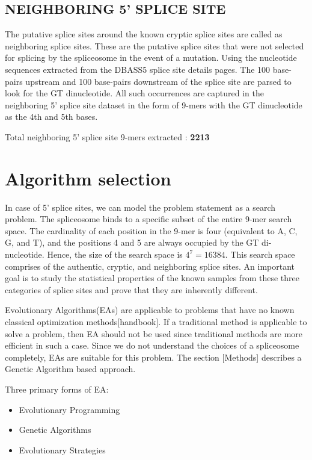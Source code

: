 \documentclass[12pt,a4paper]{article}
\begin{document}
	\subsection{NEIGHBORING 5' SPLICE SITE}
	The putative splice sites around the known cryptic splice sites are called as neighboring splice sites. These are the putative splice sites that were not selected for splicing by the spliceosome in the event of a mutation. Using the nucleotide sequences extracted from the DBASS5 splice site details pages. The 100 base-pairs upstream and 100 base-pairs downstream of the splice site are parsed to look for the GT dinucleotide. All such occurrences are captured in the neighboring 5’ splice site dataset in the form of 9-mers with the GT dinucleotide as the 4th and 5th bases.\par
	
	Total neighboring 5’ splice site 9-mers extracted : \textbf{2213}
	
	\section{Algorithm selection}
	In case of 5’ splice sites, we can model the problem statement as a search problem. The spliceosome binds to a specific subset of the entire 9-mer search space. The cardinality of each position in the 9-mer is four (equivalent to A, C, G, and T), and the positions 4 and 5 are always occupied by the GT di-nucleotide. Hence, the size of the search space is $ 4^{7} = 16384 $. This search space comprises of the authentic, cryptic, and neighboring splice sites. An important goal is to study the statistical properties of the known samples from these three categories of splice sites and prove that they are inherently different. \par
	Evolutionary Algorithms(EAs) are applicable to problems that have no known classical optimization methods[handbook]. If a traditional method is applicable to solve a problem, then EA should not be used since traditional methods are more efficient in such a case. Since we do not understand the choices of a spliceosome completely, EAs are suitable for this problem. The section [Methods] describes a Genetic Algorithm based approach.\par
	Three primary forms of EA:
	\begin{itemize}
	\item Evolutionary Programming
	\item Genetic Algorithms
	\item Evolutionary Strategies
	\end{itemize}
	
\end{document}
